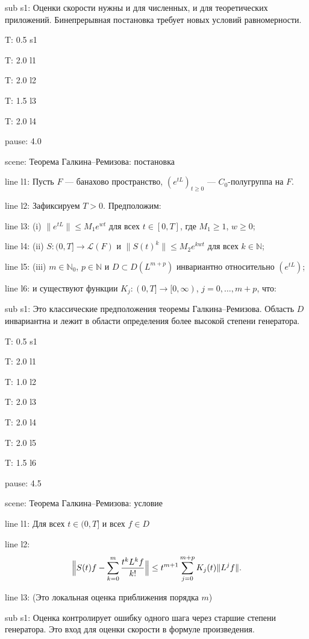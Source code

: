 \documentclass[a4paper,11pt]{article}
\newcommand{\N}{\mathbb{N}}
\begin{document}
sub s1: {Оценки скорости нужны и для численных, и для теоретических приложений. Бинепрерывная постановка требует новых условий равномерности.}


T: 0.5 s1

T: 2.0 l1

T: 2.0 l2

T: 1.5 l3

T: 2.0 l4

pause: 4.0



scene: {Теорема Галкина--Ремизова: постановка}

line l1: {Пусть $F$ --- банахово пространство, $(e^{tL})_{t\ge0}$ --- $C_0$-полугруппа на $F$.}

line l2: {Зафиксируем $T>0$. Предположим:}

line l3: {(i) $\|e^{tL}\|\le M_1e^{wt}$ для всех $t\in[0,T]$, где $M_1\ge1$, $w\ge0$;}

line l4: {(ii) $S:(0,T]\to\mathcal{L}(F)$ и $\|S(t)^k\|\le M_2e^{kwt}$ для всех $k\in\N$;}

line l5: {(iii) $m\in\N_0$, $p\in\N$ и $D\subset D(L^{m+p})$ инвариантно относительно $(e^{tL})$;}

line l6: {и существуют функции $K_j:(0,T]\to[0,\infty)$, $j=0,\dots,m+p$, что:}


sub s1: {Это классические предположения теоремы Галкина--Ремизова. Область $D$ инвариантна и лежит в области определения более высокой степени генератора.}


T: 0.5 s1

T: 2.0 l1

T: 1.0 l2

T: 2.0 l3

T: 2.0 l4

T: 2.0 l5

T: 1.5 l6

pause: 4.5



scene: {Теорема Галкина--Ремизова: условие}

line l1: {Для всех $t\in(0,T]$ и всех $f\in D$}

line l2: {$$\Bigl\|S(t)f-\sum\limits_{k=0}^{m}\frac{t^kL^kf}{k!}\Bigr\|\le t^{m+1}\sum\limits_{j=0}^{m+p}K_j(t)\|L^jf\|.$$}

line l3: {(Это локальная оценка приближения порядка $m$)}


sub s1: {Оценка контролирует ошибку одного шага через старшие степени генератора. Это вход для оценки скорости в формуле произведения.}
\end{document}
